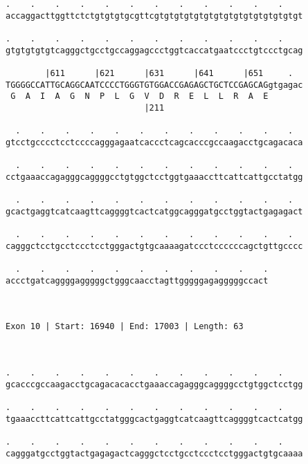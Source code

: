 \documentclass{article}
\begin{document}
\begin{Verbatim}
.    .    .    .    .    .    .    .    .    .    .    .    
accaggacttggttctctgtgtgtgcgttcgtgtgtgtgtgtgtgtgtgtgtgtgtgtgt
                                                            
.    .    .    .    .    .    .    .    .    .    .    .    
gtgtgtgtgtcagggctgcctgccaggagccctggtcaccatgaatccctgtccctgcag
                                                            
        |611      |621      |631      |641      |651     .  
TGGGGCCATTGCAGGCAATCCCCTGGGTGTGGACCGAGAGCTGCTCCGAGCAGgtgagac
 G  A  I  A  G  N  P  L  G  V  D  R  E  L  L  R  A  E       
                            |211                            
  
  .    .    .    .    .    .    .    .    .    .    .    .  
gtcctgcccctcctccccagggagaatcaccctcagcacccgccaagacctgcagacaca
                                                            
  .    .    .    .    .    .    .    .    .    .    .    .  
cctgaaaccagagggcaggggcctgtggctcctggtgaaaccttcattcattgcctatgg
                                                            
  .    .    .    .    .    .    .    .    .    .    .    .  
gcactgaggtcatcaagttcaggggtcactcatggcagggatgcctggtactgagagact
                                                            
  .    .    .    .    .    .    .    .    .    .    .    .  
cagggctcctgcctccctcctgggactgtgcaaaagatccctccccccagctgttgcccc
                                                            
  .    .    .    .    .    .    .    .    .    .    .
accctgatcaggggagggggctgggcaacctagttgggggagagggggccact
                                                     
                                                     
 
Exon 10 | Start: 16940 | End: 17003 | Length: 63



.    .    .    .    .    .    .    .    .    .    .    .    
gcacccgccaagacctgcagacacacctgaaaccagagggcaggggcctgtggctcctgg
                                                            
.    .    .    .    .    .    .    .    .    .    .    .    
tgaaaccttcattcattgcctatgggcactgaggtcatcaagttcaggggtcactcatgg
                                                            
.    .    .    .    .    .    .    .    .    .    .    .    
cagggatgcctggtactgagagactcagggctcctgcctccctcctgggactgtgcaaaa
                                                            

\end{Verbatim}
\end{document}
